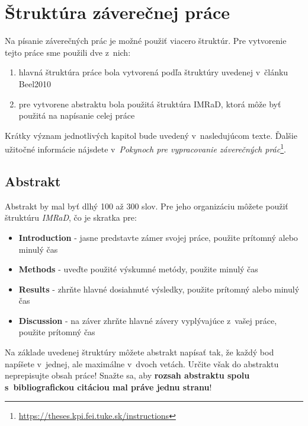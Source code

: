 
\chapter{Štruktúra záverečnej práce}\label{app:structure}

Na písanie záverečných prác je možné použiť viacero štruktúr. Pre vytvorenie tejto práce sme použili dve z~nich:

\begin{enumerate}
    \item hlavná štruktúra práce bola vytvorená podľa štruktúry uvedenej v~článku Beel2010
    \item pre vytvorene abstraktu bola použitá štruktúra IMRaD, ktorá môže byť použitá na napísanie celej práce
\end{enumerate}

Krátky význam jednotlivých kapitol bude uvedený v~nasledujúcom texte. Ďalšie užitočné informácie nájsdete v~\emph{Pokynoch pre vypracovanie záverečných prác}\footnote{\url{https://theses.kpi.fei.tuke.sk/instructions}}.


\section*{Abstrakt}


Abstrakt by mal byť dlhý 100 až 300 slov. Pre jeho organizáciu môžete použiť štruktúru \emph{IMRaD}, čo je skratka pre:

\begin{itemize}
    \item \textbf{Introduction} - jasne predstavte zámer svojej práce, použite prítomný alebo minulý čas
    \item \textbf{Methods} - uveďte použité výskumné metódy, použite minulý čas
    \item \textbf{Results} - zhrňte hlavné dosiahnuté výsledky, použite prítomný alebo minulý čas
    \item \textbf{Discussion} - na záver zhrňte hlavné závery vyplývajúce z~vašej práce, použite prítomný čas
\end{itemize}

Na základe uvedenej štruktúry môžete abstrakt napísať tak, že každý bod napíšete v~jednej, ale maximálne v~dvoch vetách. Určite však do abstraktu neprepisujte obsah práce! Snažte sa, aby {\bf rozsah abstraktu spolu s~bibliografickou citáciou mal práve jednu stranu}!



